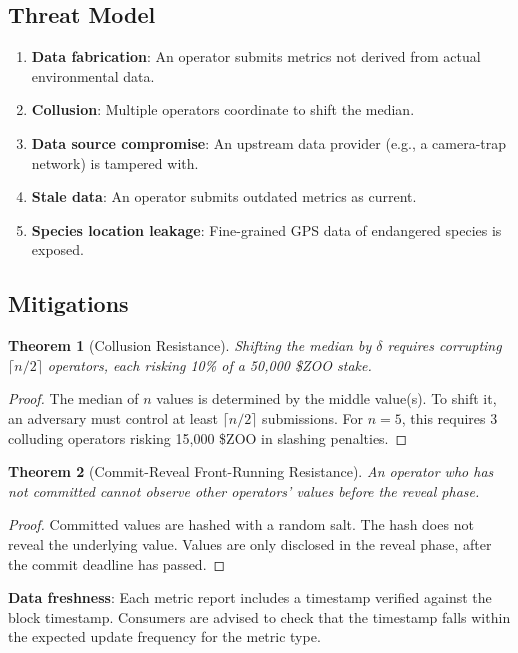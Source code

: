 \documentclass[11pt,letterpaper]{article}
\newtheorem{theorem}{Theorem}[section]
\begin{document}
\subsection{Threat Model}

\begin{enumerate}
    \item \textbf{Data fabrication}: An operator submits metrics not derived from actual environmental data.
    \item \textbf{Collusion}: Multiple operators coordinate to shift the median.
    \item \textbf{Data source compromise}: An upstream data provider (e.g., a camera-trap network) is tampered with.
    \item \textbf{Stale data}: An operator submits outdated metrics as current.
    \item \textbf{Species location leakage}: Fine-grained GPS data of endangered species is exposed.
\end{enumerate}

\subsection{Mitigations}

\begin{theorem}[Collusion Resistance]
Shifting the median by $\delta$ requires corrupting $\lceil n/2 \rceil$ operators, each risking 10\% of a 50{,}000 \$ZOO stake.
\end{theorem}

\begin{proof}
The median of $n$ values is determined by the middle value(s). To shift it, an adversary must control at least $\lceil n/2 \rceil$ submissions. For $n = 5$, this requires 3 colluding operators risking 15{,}000 \$ZOO in slashing penalties.
\end{proof}

\begin{theorem}[Commit-Reveal Front-Running Resistance]
An operator who has not committed cannot observe other operators' values before the reveal phase.
\end{theorem}

\begin{proof}
Committed values are hashed with a random salt. The hash does not reveal the underlying value. Values are only disclosed in the reveal phase, after the commit deadline has passed.
\end{proof}

\textbf{Data freshness}: Each metric report includes a timestamp verified against the block timestamp. Consumers are advised to check that the timestamp falls within the expected update frequency for the metric type.
\end{document}

